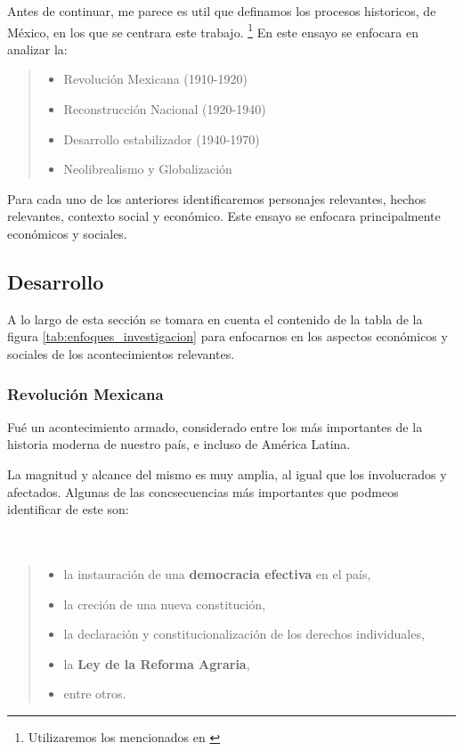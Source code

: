 \documentclass[12pt]{article}
\begin{document}
	\par Antes de continuar, me parece es util que definamos los procesos historicos, de M\'exico, en los que se centrara este trabajo. \footnote{Utilizaremos los mencionados en \cite[p. 29]{basica}} En este ensayo se enfocara en analizar la:
	
	\begin{quote}\begin{itemize}
		\item Revoluci\'on Mexicana (1910-1920)
		\item Reconstrucci\'on Nacional (1920-1940)
		\item Desarrollo estabilizador (1940-1970)
		\item Neolibrealismo y Globalizaci\'on
	\end{itemize}\end{quote}
	
	\par Para cada uno de los anteriores identificaremos personajes relevantes, hechos relevantes, contexto social y econ\'omico. Este ensayo se enfocara principalmente econ\'omicos y sociales.
	
	
	

\subsection*{Desarrollo}
	\par A lo largo de esta secci\'on se tomara en cuenta el contenido de la tabla de la figura \ref{tab:enfoques_investigacion} para enfocarnos en los aspectos econ\'omicos y sociales de los acontecimientos relevantes.
	
	

	\subsubsection*{Revoluci\'on Mexicana}

		\par Fu\'e un acontecimiento armado, considerado entre los m\'as importantes de la historia moderna de nuestro pa\'is, e incluso de Am\'erica Latina. 
		\par La magnitud y alcance del mismo es muy amplia, al igual que los involucrados y afectados. Algunas de las concsecuencias m\'as importantes que podmeos identificar de este son:\\\ \\\
		\begin{quote}\begin{itemize}
			\item la instauraci\'on de una \textbf{democracia efectiva} en el pa\'is, 
			\item la creci\'on de una nueva constituci\'on,
			\item la declaraci\'on y constitucionalización de los derechos individuales,
			\item la \textbf{Ley de la Reforma Agraria}, 
			\item entre otros.
		\end{itemize}\end{quote}
				
\end{document}
